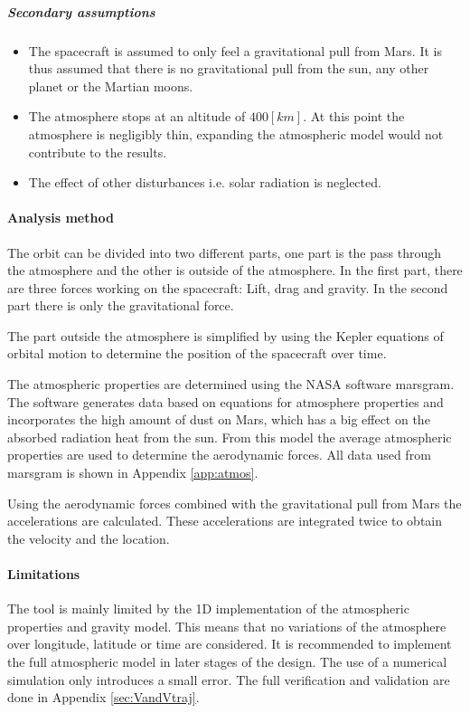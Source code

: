  \subparagraph{Secondary assumptions}
 \begin{itemize}
 \item The spacecraft is assumed to only feel a gravitational pull from Mars. It is thus assumed that there is no gravitational pull from the sun, any other planet or the Martian moons.
 \item The atmosphere stops at an altitude of $400 \left[km\right]$. At this point the atmosphere is negligibly thin, expanding the atmospheric model would not contribute to the results.
 \item The effect of other disturbances i.e. solar radiation is neglected.
 \end{itemize}

\paragraph{Analysis method}
The orbit can be divided into two different parts, one part is the pass through the atmosphere and the other is outside of the atmosphere. In the first part, there are three forces working on the spacecraft: Lift, drag and gravity. In the second part there is only the gravitational force.

The part outside the atmosphere is simplified by using the Kepler equations of orbital motion to determine the position of the spacecraft over time.

The atmospheric properties are determined using the NASA software \gls{marsgram}. The software generates data based on equations for atmosphere properties and incorporates the high amount of dust on Mars, which has a big effect on the absorbed radiation heat from the sun. From this model the average atmospheric properties are used to determine the aerodynamic forces. All data used from \gls{marsgram} is shown in Appendix \ref{app:atmos}. 

Using the aerodynamic forces combined with the gravitational pull from Mars the accelerations are calculated. These accelerations are integrated twice to obtain the velocity and the location.

\paragraph{Limitations}
The tool is mainly limited by the 1D implementation of the atmospheric properties and gravity model. This means that no variations of the atmosphere over longitude, latitude or time are considered. It is recommended to implement the full atmospheric model in later stages of the design. The use of a numerical simulation only introduces a small error. The full verification and validation are done in Appendix \ref{sec:VandVtraj}.